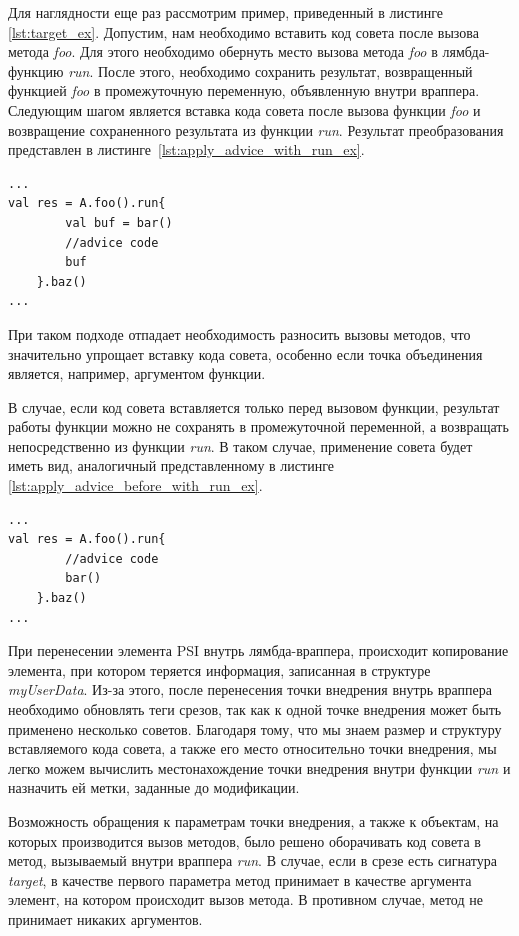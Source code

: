 Для наглядности еще раз рассмотрим пример, приведенный в листинге
\ref{lst:target_ex}.
Допустим, нам необходимо вставить код совета после вызова метода \textit{foo}.
Для этого необходимо обернуть место вызова метода \textit{foo} в лямбда-функцию
\textit{run}.
После этого, необходимо сохранить результат, возвращенный функцией \textit{foo}
в промежуточную переменную, объявленную внутри враппера.
Следующим шагом является вставка кода совета после вызова функции \textit{foo} и возвращение сохраненного результата из функции \textit{run}.
Результат преобразования представлен в листинге~\ref{lst:apply_advice_with_run_ex}.
\begin{lstlisting}[style={java}, label=lst:apply_advice_with_run_ex,
    caption={Пример внедрения кода совета с использованием функции run}]
...
val res = A.foo().run{
        val buf = bar()
        //advice code
        buf
    }.baz()
...
\end{lstlisting}

При таком подходе отпадает необходимость разносить вызовы методов, что
значительно упрощает вставку кода совета, особенно если точка объединения
является, например, аргументом функции.

В случае, если код совета вставляется только перед вызовом функции, результат
работы функции можно не сохранять в промежуточной переменной, а возвращать
непосредственно из функции \textit{run}.
В таком случае, применение совета будет иметь вид, аналогичный представленному
в листинге \ref{lst:apply_advice_before_with_run_ex}.
\begin{lstlisting}[style={java}, label=lst:apply_advice_before_with_run_ex,
    caption={Пример внедрения кода совета после точки объединения с использованием функции run}]
...
val res = A.foo().run{
        //advice code
        bar()
    }.baz()
...
\end{lstlisting}

При перенесении элемента PSI внутрь лямбда-враппера, происходит копирование
элемента, при котором теряется информация, записанная в структуре
\textit{myUserData}.
Из-за этого, после перенесения точки внедрения внутрь враппера необходимо
обновлять теги срезов, так как к одной точке внедрения может быть применено
несколько советов.
Благодаря тому, что мы знаем размер и структуру вставляемого кода совета, а
также его место относительно точки внедрения, мы легко можем вычислить
местонахождение точки внедрения внутри функции \textit{run} и назначить ей
метки, заданные до модификации.

Возможность обращения к параметрам точки внедрения, а также к объектам, на
которых производится вызов методов, было решено оборачивать код совета в метод,
вызываемый внутри враппера \textit{run}.
В случае, если в срезе есть сигнатура \textit{target}, в качестве первого параметра метод принимает в качестве аргумента элемент, на котором происходит вызов метода.
В противном случае, метод не принимает никаких аргументов.

